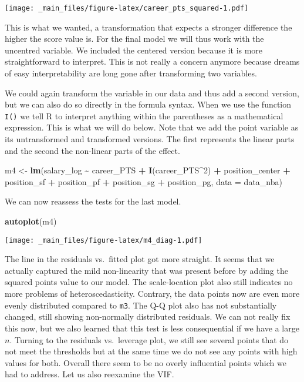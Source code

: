 \documentclass[
]{book}
\newenvironment{Shaded}{\begin{snugshade}}{\end{snugshade}}
\newcommand{\AttributeTok}[1]{\textcolor[rgb]{0.13,0.29,0.53}{#1}}
\newcommand{\DecValTok}[1]{\textcolor[rgb]{0.00,0.00,0.81}{#1}}
\newcommand{\FunctionTok}[1]{\textcolor[rgb]{0.13,0.29,0.53}{\textbf{#1}}}
\newcommand{\NormalTok}[1]{#1}
\newcommand{\OtherTok}[1]{\textcolor[rgb]{0.56,0.35,0.01}{#1}}
\newcommand{\SpecialCharTok}[1]{\textcolor[rgb]{0.81,0.36,0.00}{\textbf{#1}}}
\begin{document}
\texttt{[image: \_main\_files/figure-latex/career\_pts\_squared-1.pdf]}

This is what we wanted, a transformation that expects a stronger difference the
higher the score value is. For the final model we will thus work with the
uncentred variable. We included the centered version because it is more
straightforward to interpret. This is not really a concern anymore because
dreams of easy interpretability are long gone after transforming two variables.

We could again transform the variable in our data and thus add a second version,
but we can also do so directly in the formula syntax. When we use the function
\texttt{I()} we tell R to interpret anything within the parentheses as a mathematical
expression. This is what we will do below. Note that we add the point variable
as its untransformed and transformed versions. The first represents the linear
parts and the second the non-linear parts of the effect.

\begin{Shaded}
\begin{Highlighting}[]
\NormalTok{m4 }\OtherTok{\textless{}{-}} \FunctionTok{lm}\NormalTok{(salary\_log }\SpecialCharTok{\textasciitilde{}}\NormalTok{ career\_PTS }\SpecialCharTok{+} \FunctionTok{I}\NormalTok{(career\_PTS}\SpecialCharTok{\^{}}\DecValTok{2}\NormalTok{) }\SpecialCharTok{+}\NormalTok{ position\_center }\SpecialCharTok{+}\NormalTok{ position\_sf }\SpecialCharTok{+}\NormalTok{ position\_pf }\SpecialCharTok{+}\NormalTok{ position\_sg }\SpecialCharTok{+}\NormalTok{ position\_pg, }\AttributeTok{data =}\NormalTok{ data\_nba)}
\end{Highlighting}
\end{Shaded}

We can now reassess the tests for the last model.

\begin{Shaded}
\begin{Highlighting}[]
\FunctionTok{autoplot}\NormalTok{(m4)}
\end{Highlighting}
\end{Shaded}

\texttt{[image: \_main\_files/figure-latex/m4\_diag-1.pdf]}

The line in the residuals vs.~fitted plot got more straight. It seems that we
actually captured the mild non-linearity that was present before by adding the
squared points value to our model. The scale-location plot also still indicates
no more problems of heteroscedasticity. Contrary, the data points now are even
more evenly distributed compared to \texttt{m3}. The Q-Q plot also has not substantially changed,
still showing non-normally distributed residuals. We can not really fix this
now, but we also learned that this test is less consequential if we have a
large \(n\). Turning to the residuals vs.~leverage plot, we still see several points
that do not meet the thresholds but at the same time we do not see any points
with high values for both. Overall there seem to be no overly influential points
which we had to address. Let us also reexamine the VIF.
\end{document}
